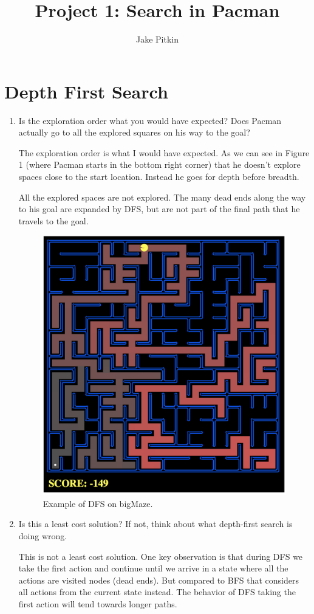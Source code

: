 \documentclass[fleqn]{hermans-hw}
\title{Project 1: Search in Pacman}
\institute{University of Utah}
\author{Jake Pitkin}
\begin{document}
\maketitle
\section{Depth First Search}
\begin{enumerate}
	\item Is the exploration order what you would have expected? Does Pacman actually go to all the explored squares on his way to the goal?
	
	The exploration order is what I would have expected. As we can see in Figure 1 (where Pacman starts in the bottom right corner) that he doesn't explore spaces close to the start location. Instead he goes for depth before breadth. 
	
	All the explored spaces are not explored. The many dead ends along the way to his goal are expanded by DFS, but are not part of the final path that he travels to the goal.
	
	\begin{figure}[H]
  \centerline{\includegraphics[width=0.5\linewidth]{img_1.png}}
  \caption{Example of DFS on bigMaze.}
\end{figure}
	
	\item Is this a least cost solution? If not, think about what depth-first search is doing wrong.
	
	This is not a least cost solution. One key observation is that during DFS we take the first action and continue until we arrive in a state where all the actions are visited nodes (dead ends). But compared to BFS that considers all actions from the current state instead. The behavior of DFS taking the first action will tend towards longer paths.
\end{enumerate}
\end{document}
